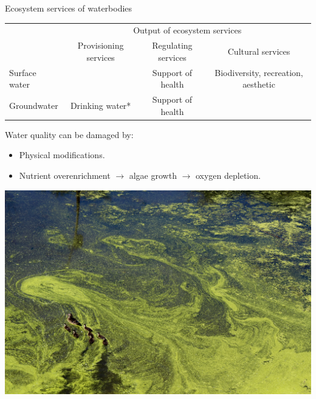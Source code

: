 \begin{frame}{Ecosystem services of waterbodies}
  \begin{table}\hspace{-.6cm}
    \scriptsize
      \begin{tabular}{l|c|c|c|} %
        \multicolumn{1}{c}{} & \multicolumn{3}{c}{Output of ecosystem services}\\ %
        \multicolumn{1}{c}{} & \multicolumn{1}{c}{Provisioning services} & \multicolumn{1}{c}{Regulating services} & \multicolumn{1}{c}{Cultural services} \\\cline{2-4} %
        Surface water & & Support of health & Biodiversity, recreation, aesthetic \\\cline{2-4} %
        \pause
        Groundwater & Drinking water* & Support of health &  \\\cline{2-4}
      \end{tabular}
  \end{table}
  \pause
  Water quality can be damaged by:
  \begin{itemize}
    \item Physical modifications.
    \pause
    \item Nutrient overenrichment $\rightarrow$ algae growth $\rightarrow$ oxygen depletion.
  \end{itemize}
  \hspace{-.8cm}
  \includegraphics[width=1.1\textwidth]{figures/algae}

\end{frame}
